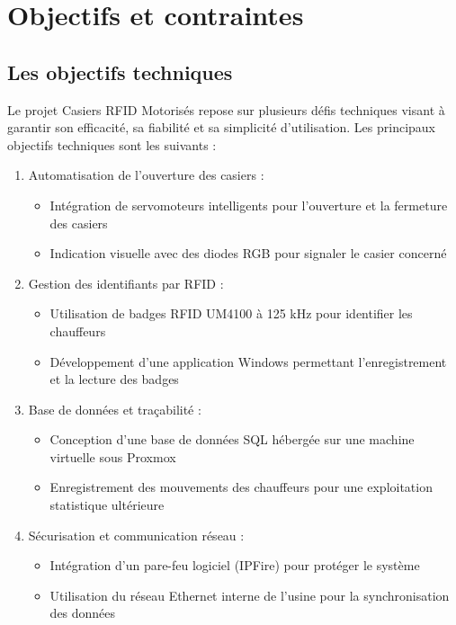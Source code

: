 \documentclass[main.tex]{subfiles}
\begin{document}
\section{Objectifs et contraintes}

\subsection{Les objectifs techniques}

\quad Le projet Casiers RFID Motorisés repose sur plusieurs défis techniques visant à garantir son efficacité, sa fiabilité et sa simplicité d’utilisation. Les principaux objectifs techniques sont les suivants :

\begin{enumerate}

	\item Automatisation de l’ouverture des casiers :
	\begin{itemize}
		\item Intégration de servomoteurs intelligents pour l’ouverture et la fermeture des casiers
		\item Indication visuelle avec des diodes RGB pour signaler le casier concerné
	\end{itemize}
	\item Gestion des identifiants par RFID :
	\begin{itemize}
		\item Utilisation de badges RFID UM4100 à 125 kHz pour identifier les chauffeurs
		\item Développement d’une application Windows permettant l’enregistrement et la lecture des badges
	\end{itemize}
	\item Base de données et traçabilité :
	\begin{itemize}
		\item Conception d’une base de données SQL hébergée sur une machine virtuelle sous Proxmox
		\item Enregistrement des mouvements des chauffeurs pour une exploitation statistique ultérieure
	\end{itemize}
	\item Sécurisation et communication réseau :
	\begin{itemize}
		\item Intégration d’un pare-feu logiciel (IPFire) pour protéger le système
		\item Utilisation du réseau Ethernet interne de l’usine pour la synchronisation des données
	\end{itemize}
	
\end{enumerate}
\end{document}
